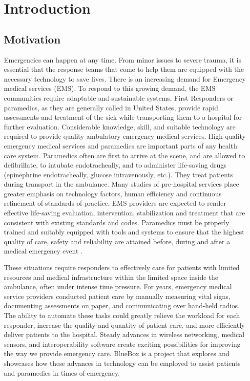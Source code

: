 \chapter{Introduction}
\section{Motivation}


Emergencies can happen at any time. From minor issues to severe
trauma, it is essential that the response teams that come to help
them are equipped with the necessary technology to save lives. There
is an increasing demand for Emergency medical services (EMS). To
respond to this growing demand, the EMS communities require adaptable
and sustainable systems. First Responders or paramedics, as they are
generally called in United States, provide rapid assessments and
treatment of the sick while transporting them to a hospital for
further evaluation. Considerable knowledge, skill, and suitable
technology are required to provide quality ambulatory emergency
medical services. High-quality emergency medical services and
paramedics are important parts of any health care system. Paramedics
often are first to arrive at the scene, and are allowed to
defibrillate, to intubate endotracheally, and to administer
life-saving drugs (epinephrine endotracheally, glucose intravenously,
etc.). They treat patients during transport in the ambulance. Many
studies of pre-hospital services place greater emphasis on technology
factors, human efficiency and continuous refinement of standards of
practice. EMS providers are expected to render effective life-saving
evaluation, intervention, stabilization and treatment that are
consistent with existing standards and codes. Paramedics must be
properly trained and suitably equipped with tools and systems to
ensure that the highest quality of care, safety and reliability are
attained before, during and after a medical emergency event
\cite{EMS, EMS1, EMS2, EMS3}.

These situations require responders to effectively care for patients
with limited resources and medical infrastructure within the limited
space inside the ambulance, often under intense time pressure. For
years, emergency medical service providers conducted patient care by
manually measuring vital signs, documenting assessments on paper, and
communicating over hand-held radios. The ability to automate these
tasks could greatly relieve the workload for each responder, increase
the quality and quantity of patient care, and more efficiently
deliver patients to the hospital.  Steady advances in wireless
networking, medical sensors, and interoperability software create
exciting possibilities for improving the way we provide emergency
care. BlueBox is a project that explores and showcases how these
advances in technology can be employed to assist patients and
paramedics in times of emergency. 

